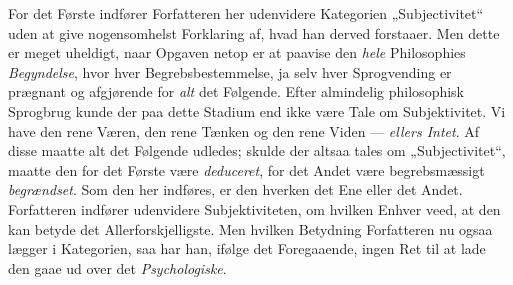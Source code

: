 \documentclass[12pt,a4paper]{book}
\newcommand{\opage}[1]{\marginnote{\footnotesize\textit{[#1]}}}
\begin{document}
\opage{62}\setcounter{footnote}{0}%
For det Første indfører Forfatteren her udenvidere
Kategorien „Subjectivitet“ uden at give nogensomhelst
Forklaring af, hvad han derved forstaaer. Men dette er
meget uheldigt, naar Opgaven netop er at paavise den \emph{hele}
Philosophies \emph{Begyndelse}, hvor hver Begrebsbestemmelse,
ja selv hver Sprogvending er prægnant og afgjørende
for \emph{alt} det Følgende. Efter almindelig philosophisk
Sprogbrug kunde der paa dette Stadium end
ikke være Tale om Subjektivitet. Vi have den rene
Væren, den rene Tænken og den rene Viden --- \emph{ellers
Intet}. Af disse maatte alt det Følgende udledes;
skulde der altsaa tales om „Subjectivitet“, maatte den
for det Første være \emph{deduceret}, for det Andet være begrebsmæssigt
\emph{begrændset}. Som den her indføres, er
den hverken det Ene eller det Andet. Forfatteren indfører
udenvidere Subjektiviteten, om hvilken Enhver
veed, at den kan betyde det Allerforskjelligste. Men
hvilken Betydning Forfatteren nu ogsaa lægger i Kategorien,
saa har han, ifølge det Foregaaende, ingen Ret
til at lade den gaae ud over det \emph{Psychologiske}.
\end{document}
